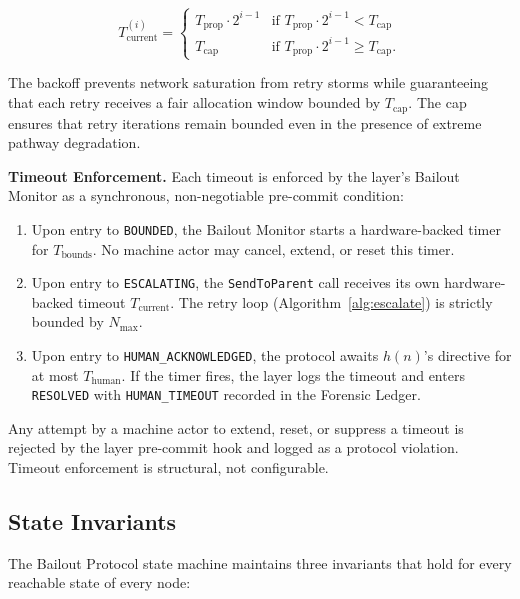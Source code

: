 \[
T_{\text{current}}^{(i)} =
\begin{cases}
T_{\text{prop}} \cdot 2^{i-1} & \text{if } T_{\text{prop}} \cdot 2^{i-1} < T_{\text{cap}} \\[4pt]
T_{\text{cap}}                 & \text{if } T_{\text{prop}} \cdot 2^{i-1} \geq T_{\text{cap}}.
\end{cases}
\tag{EB}
\]

The backoff prevents network saturation from retry storms while guaranteeing that each retry receives a fair allocation window bounded by $T_{\text{cap}}$. The cap ensures that retry iterations remain bounded even in the presence of extreme pathway degradation.

\medskip
\noindent\textbf{Timeout Enforcement.} Each timeout is enforced by the \fact{} layer's Bailout Monitor as a synchronous, non-negotiable pre-commit condition:

\begin{enumerate}\itemsep=0pt
\item Upon entry to \texttt{BOUNDED}, the Bailout Monitor starts a hardware-backed timer for $T_{\text{bounds}}$. No machine actor may cancel, extend, or reset this timer.
\item Upon entry to \texttt{ESCALATING}, the \texttt{SendToParent} call receives its own hardware-backed timeout $T_{\text{current}}$. The retry loop (Algorithm~\ref{alg:escalate}) is strictly bounded by $N_{\max}$.
\item Upon entry to \texttt{HUMAN\_ACKNOWLEDGED}, the protocol awaits $h(n)$'s directive for at most $T_{\text{human}}$. If the timer fires, the \fact{} layer logs the timeout and enters \texttt{RESOLVED} with \texttt{HUMAN\_TIMEOUT} recorded in the Forensic Ledger.
\end{enumerate}

Any attempt by a machine actor to extend, reset, or suppress a timeout is rejected by the \fact{} layer pre-commit hook and logged as a protocol violation. Timeout enforcement is structural, not configurable.

\subsection{State Invariants}\label{sec:invariants}

The Bailout Protocol state machine maintains three invariants that hold for every reachable state of every node:

